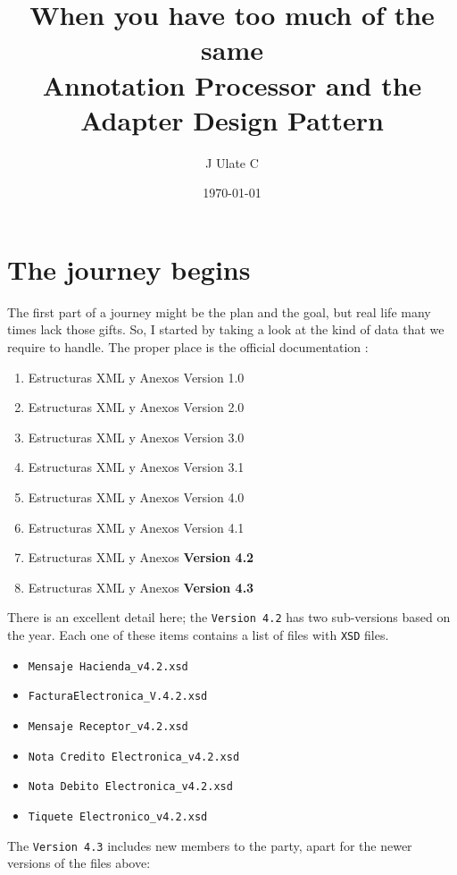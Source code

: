 \documentclass{article}
\title{When you have too much of the same \\
{\small Annotation Processor and the Adapter Design Pattern}}
\author{J Ulate C}
\date{\today}
\begin{document}
\maketitle

\section{The journey begins}

The first part of a journey might be the plan and the goal, but real life many times lack those gifts. So, I started by taking a look at the kind of data that we require to handle.
The proper place is the official documentation \cite{MinisteriodeHacienda2020PortalEstructuras}:

\begin{enumerate}
\item Estructuras XML y Anexos Version 1.0
\item Estructuras XML y Anexos Version 2.0
\item Estructuras XML y Anexos Version 3.0
\item Estructuras XML y Anexos Version 3.1
\item Estructuras XML y Anexos Version 4.0
\item Estructuras XML y Anexos Version 4.1
\item Estructuras XML y Anexos \textbf{Version 4.2}
\item Estructuras XML y Anexos \textbf{Version 4.3}
\end{enumerate}

There is an excellent detail here; the \texttt{Version 4.2} has two sub-versions based on the year. Each one of these items contains a list of files with \texttt{XSD} files. 

\begin{itemize}
\item \texttt{Mensaje Hacienda\_v4.2.xsd}
\item \texttt{FacturaElectronica\_V.4.2.xsd}
\item \texttt{Mensaje Receptor\_v4.2.xsd}
\item \texttt{Nota Credito Electronica\_v4.2.xsd}
\item \texttt{Nota Debito Electronica\_v4.2.xsd}
\item \texttt{Tiquete Electronico\_v4.2.xsd}
\end{itemize}

The \texttt{Version 4.3} includes new members to the party, apart for the newer versions of the files above:
\end{document}

